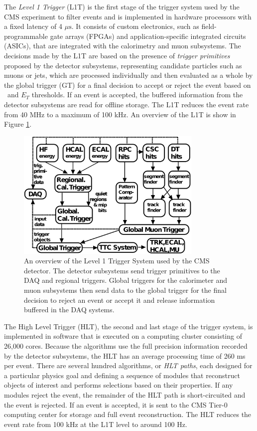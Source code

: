 The \textit{Level 1 Trigger} (L1T) is the first stage of the trigger system used by the CMS experiment to filter events and is implemented in hardware processors with a fixed latency of 4 $\mu\mathrm{s}$. It consists of custom electronics, such as field-programmable gate arrays (FPGAs) and application-specific integrated circuits (ASICs), that are integrated with the calorimetry and muon subsystems. The decisions made by the L1T are based on the presence of \textit{trigger primitives} proposed by the detector subsystems, representing candidate particles such as muons or jets, which are processed individually and then evaluated as a whole by the global trigger (GT) for a final decision to accept or reject the event based on \pT\ and $E_{T}$ thresholds. If an event is accepted, the buffered information from the detector subsystems are read for offline storage. The L1T reduces the event rate from 40 MHz to a maximum of 100 kHz. An overview of the L1T is show in Figure \ref{fig:CMSL1T}.

\begin{figure}[htbp]
  \centering
    \includegraphics[width=3.5in]{images/l1t_overview}
    \caption[Overview of the Level 1 Trigger System]{An overview of the Level 1 Trigger System used by the CMS detector. The detector subsystems send trigger primitives to the DAQ and regional triggers. Global triggers for the calorimeter and muon subsystems then send data to the global trigger for the final decision to reject an event or accept it and release information buffered in the DAQ systems.\cite{CMSTRIDAS}}
    \label{fig:CMSL1T}
\end{figure}

The High Level Trigger (HLT), the second and last stage of the trigger system, is implemented in software that is executed on a computing cluster consisting of 26,000 cores. Because the algorithms use the full precision information recorded by the detector subsystems, the HLT has an average processing time of 260 ms per event.\cite{CMSHLT} There are several hundred algorithms, or \textit{HLT paths}, each designed for a particular physics goal and defining a sequence of modules that reconstruct objects of interest and performs selections based on their properties. If any modules reject the event, the remainder of the HLT path is short-circuited and the event is rejected. If an event is accepted, it is sent to the CMS Tier-0 computing center for storage and full event reconstruction. The HLT reduces the event rate from 100 kHz at the L1T level to around 100 Hz.

